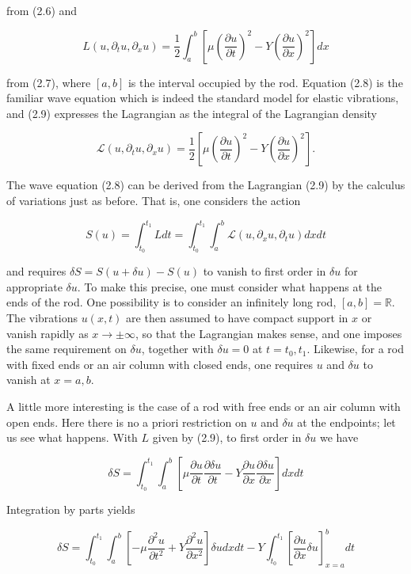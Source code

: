 \documentclass[10pt, letterpaper]{article}
\begin{document}
from (2.6) and

$$
L\left(u, \partial_{t} u, \partial_{x} u\right)=\frac{1}{2} \int_{a}^{b}\left[\mu\left(\frac{\partial u}{\partial t}\right)^{2}-Y\left(\frac{\partial u}{\partial x}\right)^{2}\right] d x
$$

from (2.7), where $[a, b]$ is the interval occupied by the rod. Equation (2.8) is the familiar wave equation which is indeed the standard model for elastic vibrations, and (2.9) expresses the Lagrangian as the integral of the Lagrangian density

$$
\mathcal{L}\left(u, \partial_{t} u, \partial_{x} u\right)=\frac{1}{2}\left[\mu\left(\frac{\partial u}{\partial t}\right)^{2}-Y\left(\frac{\partial u}{\partial x}\right)^{2}\right] .
$$

The wave equation (2.8) can be derived from the Lagrangian (2.9) by the calculus of variations just as before. That is, one considers the action

$$
S(u)=\int_{t_{0}}^{t_{1}} L d t=\int_{t_{0}}^{t_{1}} \int_{a}^{b} \mathcal{L}\left(u, \partial_{x} u, \partial_{t} u\right) d x d t
$$

and requires $\delta S=S(u+\delta u)-S(u)$ to vanish to first order in $\delta u$ for appropriate $\delta u$. To make this precise, one must consider what happens at the ends of the rod. One possibility is to consider an infinitely long rod, $[a, b]=\mathbb{R}$. The vibrations $u(x, t)$ are then assumed to have compact support in $x$ or vanish rapidly as $x \rightarrow \pm \infty$, so that the Lagrangian makes sense, and one imposes the same requirement on $\delta u$, together with $\delta u=0$ at $t=t_{0}, t_{1}$. Likewise, for a rod with fixed ends or an air column with closed ends, one requires $u$ and $\delta u$ to vanish at $x=a, b$.

A little more interesting is the case of a rod with free ends or an air column with open ends. Here there is no a priori restriction on $u$ and $\delta u$ at the endpoints; let us see what happens. With $L$ given by (2.9), to first order in $\delta u$ we have

$$
\delta S=\int_{t_{0}}^{t_{1}} \int_{a}^{b}\left[\mu \frac{\partial u}{\partial t} \frac{\partial \delta u}{\partial t}-Y \frac{\partial u}{\partial x} \frac{\partial \delta u}{\partial x}\right] d x d t
$$

Integration by parts yields

$$
\delta S=\int_{t_{0}}^{t_{1}} \int_{a}^{b}\left[-\mu \frac{\partial^{2} u}{\partial t^{2}}+Y \frac{\partial^{2} u}{\partial x^{2}}\right] \delta u d x d t-Y \int_{t_{0}}^{t_{1}}\left[\frac{\partial u}{\partial x} \delta u\right]_{x=a}^{b} d t
$$
\end{document}
